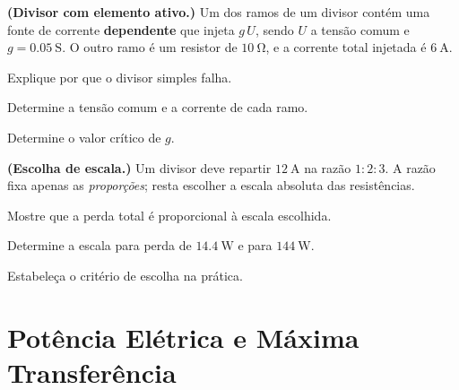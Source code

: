 \begin{questao}[4]{}

\textbf{(Divisor com elemento ativo.)} Um dos ramos de um divisor contém uma
fonte de corrente \textbf{dependente} que injeta $g\,U$, sendo $U$ a tensão
comum e $g=\SI{0.05}{\ensuremath{\mathrm{S}}}$. O outro ramo é um resistor de
$\SI{10}{\ohm}$, e a corrente total injetada é $\SI{6}{\ampere}$.
\begin{itensq}
\item Explique por que o divisor simples falha.
\item Determine a tensão comum e a corrente de cada ramo.
\item Determine o valor crítico de $g$.
\end{itensq}


\end{questao}
\begin{questao}[4]{}

\textbf{(Escolha de escala.)} Um divisor deve repartir $\SI{12}{\ampere}$ na
razão $1{:}2{:}3$. A razão fixa apenas as \emph{proporções}; resta escolher a
escala absoluta das resistências.
\begin{itensq}
\item Mostre que a perda total é proporcional à escala escolhida.
\item Determine a escala para perda de $\SI{14.4}{\watt}$ e para
      $\SI{144}{\watt}$.
\item Estabeleça o critério de escolha na prática.
\end{itensq}


\end{questao}


\section{Potência Elétrica e Máxima Transferência}

